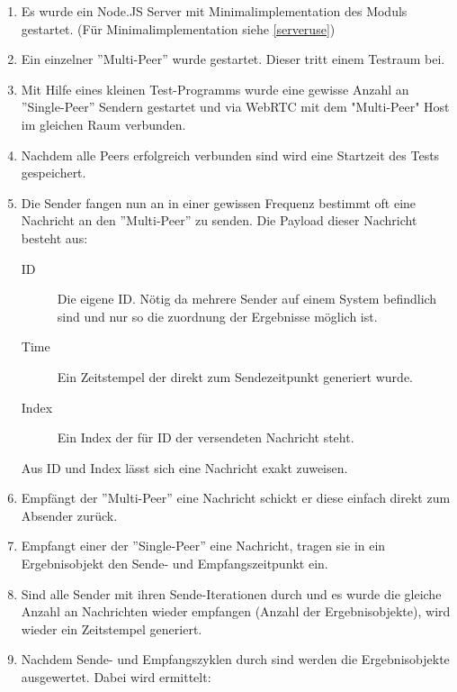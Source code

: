 \begin{enumerate}
\item
Es wurde ein Node.JS Server mit Minimalimplementation des Moduls gestartet. (Für Minimalimplementation siehe \ref{serveruse})

\item
Ein einzelner ''Multi-Peer'' wurde gestartet. Dieser tritt einem Testraum bei.

\item
Mit Hilfe eines kleinen Test-Programms wurde eine gewisse Anzahl an ''Single-Peer'' Sendern gestartet und via WebRTC mit dem "Multi-Peer" Host im gleichen Raum verbunden.

\item
Nachdem alle Peers erfolgreich verbunden sind wird eine Startzeit des Tests gespeichert.

\item
Die Sender fangen nun an in einer gewissen Frequenz bestimmt oft eine Nachricht an den ''Multi-Peer'' zu senden.
Die Payload dieser Nachricht besteht aus:
  \begin{description}
  \item[ID]
  Die eigene ID. Nötig da mehrere Sender auf einem System befindlich sind und nur so die zuordnung der Ergebnisse möglich ist.
  
  \item[Time]
  Ein Zeitstempel der direkt zum Sendezeitpunkt generiert wurde.
  
  \item[Index]
  Ein Index der für ID der versendeten Nachricht steht.
  \end{description}

Aus ID und Index lässt sich eine Nachricht exakt zuweisen.

\item
Empfängt der ''Multi-Peer'' eine Nachricht schickt er diese einfach direkt zum Absender zurück.

\item
Empfangt einer der ''Single-Peer'' eine Nachricht, tragen sie in ein Ergebnisobjekt den Sende- und Empfangszeitpunkt ein.

\item
Sind alle Sender mit ihren Sende-Iterationen durch und es wurde die gleiche Anzahl an Nachrichten wieder empfangen (Anzahl der Ergebnisobjekte), wird wieder ein Zeitstempel generiert.

\item
Nachdem Sende- und Empfangszyklen durch sind werden die Ergebnisobjekte ausgewertet. Dabei wird ermittelt:


\end{enumerate}
